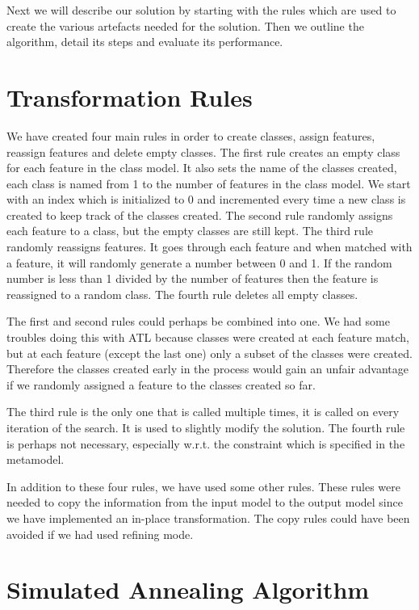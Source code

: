 \documentclass[a4paper]{article}
\begin{document}
Next we will describe our solution by starting with the rules which are used to create the various artefacts needed for the solution.
Then we outline the algorithm, detail its steps and evaluate its performance.


\section{Transformation Rules}\label{sec:rules}

We have created four main rules in order to create classes, assign features, reassign features and delete empty classes.
The first rule creates an empty class for each feature in the class model.
It also sets the name of the classes created, each class is named from 1 to the number of features in the class model.
We start with an index which is initialized to 0 and incremented every time a new class is created to keep track of the classes created.
The second rule randomly assigns each feature to a class, but the empty classes are still kept.
The third rule randomly reassigns features.
It goes through each feature and when matched with a feature, it will randomly generate a number between 0 and 1.
If the random number is less than 1 divided by the number of features then the feature is reassigned to a random class.
The fourth rule deletes all empty classes.

The first and second rules could perhaps be combined into one.
We had some troubles doing this with ATL because classes were created at each feature match, but at each feature (except the last one) only a subset of the classes were created. 
Therefore the classes created early in the process would gain an unfair advantage if we randomly assigned a feature to the classes created so far.

The third rule is the only one that is called multiple times, it is called on every iteration of the search.
It is used to slightly modify the solution.
The fourth rule is perhaps not necessary, especially w.r.t. the constraint which is specified in the metamodel.

In addition to these four rules, we have used some other rules.
These rules were needed to copy the information from the input model to the output model since we have implemented an in-place transformation.
The copy rules could have been avoided if we had used refining mode.

\section{Simulated Annealing Algorithm}
\end{document}
